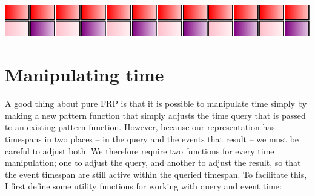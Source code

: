 \begin{Shaded}
\begin{Highlighting}[]
\OtherTok{=}\NormalTok{ stack [atom }\NormalTok{, interlace [atom }\NormalTok{]]}
\end{Highlighting}
\end{Shaded}

\includegraphics{../figures/fig3.pdf}\\

\section{Manipulating time}\label{manipulating-time}

A good thing about pure FRP is that it is possible to manipulate time
simply by making a new pattern function that simply adjusts the time
query that is passed to an existing pattern function. However, because
our representation has timespans in two places -- in the query and the
events that result -- we must be careful to adjust both. We therefore
require two functions for every time manipulation; one to adjust the
query, and another to adjust the result, so that the event timespan are
still active within the queried timespan. To facilitate this, I first
define some utility functions for working with query and event time:

